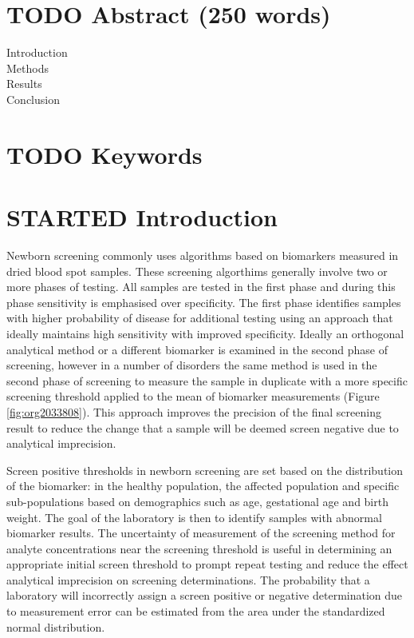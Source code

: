 \documentclass[review]{elsarticle}
\begin{document}
\section*{{\bfseries\sffamily TODO} Abstract (250 words)}
\label{sec:orga72e1c6}
\begin{description}
\item[{Introduction}] 

\item[{Methods}] 

\item[{Results}] 

\item[{Conclusion}] 
\end{description}
\section*{{\bfseries\sffamily TODO} Keywords}
\label{sec:org2f9a7dc}
\section*{{\bfseries\sffamily STARTED} Introduction}
\label{sec:org2db0db8}

Newborn screening commonly uses algorithms based on biomarkers
measured in dried blood spot samples. These screening algorthims
generally involve two or more phases of testing. All samples are
tested in the first phase and during this phase sensitivity is
emphasised over specificity. The first phase identifies samples with
higher probability of disease for additional testing using an approach
that ideally maintains high sensitivity with improved
specificity. Ideally an orthogonal analytical method or a different
biomarker is examined in the second phase of screening, however in a
number of disorders the same method is used in the second phase of
screening to measure the sample in duplicate with a more specific
screening threshold applied to the mean of biomarker measurements
(Figure \ref{fig:org2033808}). This approach improves the precision of the
final screening result to reduce the change that a sample will be
deemed screen negative due to analytical imprecision.

Screen positive thresholds in newborn screening are set based on the
distribution of the biomarker: in the healthy population, the affected
population and specific sub-populations based on demographics such as
age, gestational age and birth weight. The goal of the laboratory is
then to identify samples with abnormal biomarker results. The
uncertainty of measurement of the screening method for analyte
concentrations near the screening threshold is useful in determining
an appropriate initial screen threshold to prompt repeat testing and
reduce the effect analytical imprecision on screening
determinations. The probability that a laboratory will incorrectly
assign a screen positive or negative determination due to measurement
error can be estimated from the area under the standardized normal
distribution.
\end{document}
